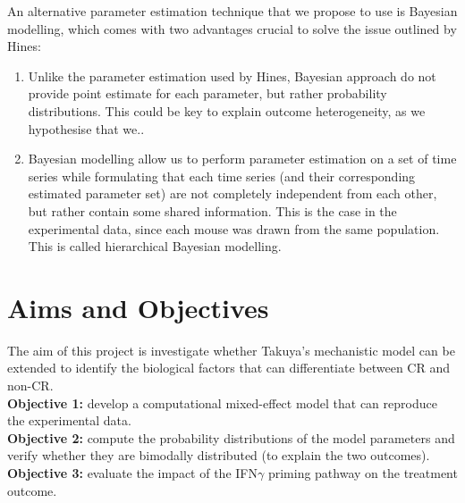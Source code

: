 \documentclass[11pt]{article}
\begin{document}
An alternative parameter estimation technique that we propose to use is Bayesian modelling, which comes with two advantages crucial to solve the issue outlined by Hines:
\begin{enumerate}
    \item Unlike the parameter estimation used by Hines, Bayesian approach do not provide point estimate for each parameter, but rather probability distributions. This could be key to explain outcome heterogeneity, as we hypothesise that we..
    \item Bayesian modelling allow us to perform parameter estimation on a set of time series while formulating that each time series (and their corresponding estimated parameter set) are not completely independent from each other, but rather contain some shared information. This is the case in the experimental data, since each mouse was drawn from the same population. This is called hierarchical Bayesian modelling.
\end{enumerate}


\section{Aims and Objectives}
\noindent The aim of this project is investigate whether Takuya's mechanistic model can be extended to identify the biological factors that can differentiate between CR and non-CR.\\[8pt]
\textbf{Objective 1:} develop a computational mixed-effect model that can reproduce the experimental data.\\ 
\textbf{Objective 2:} compute the probability distributions of the model parameters and verify whether they are bimodally distributed (to explain the two outcomes).\\ 
\textbf{Objective 3:} evaluate the impact of the IFN$\gamma$ priming pathway on the treatment outcome. 
\end{document}
